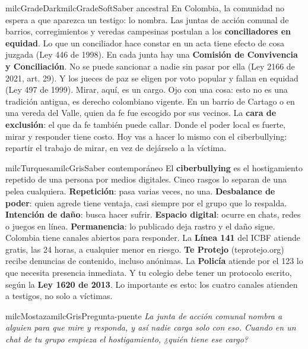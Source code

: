 \documentclass[11pt,letterpaper]{article}
\begin{document}
\begin{softbox}{milcGradeDark}{milcGradeSoft}{Saber ancestral}
En Colombia, la comunidad no espera a que aparezca un testigo: lo nombra. Las juntas de acción comunal de barrios, corregimientos y veredas campesinas postulan a los \textbf{conciliadores en equidad}. Lo que un conciliador hace constar en un acta tiene efecto de cosa juzgada (Ley 446 de 1998). En cada junta hay una \textbf{Comisión de Convivencia y Conciliación}. No se puede sancionar a nadie sin pasar por ella (Ley 2166 de 2021, art. 29). Y los jueces de paz se eligen por voto popular y fallan en equidad (Ley 497 de 1999). Mirar, aquí, es un cargo. Ojo con una cosa: esto no es una tradición antigua, es derecho colombiano vigente. En un barrio de Cartago o en una vereda del Valle, quien da fe fue escogido por sus vecinos. La \textbf{cara de exclusión}: el que da fe también puede callar. Donde el poder local es fuerte, mirar y responder tiene costo. Hoy vas a hacer lo mismo con el ciberbullying: repartir el trabajo de mirar, en vez de dejárselo a la víctima.\par{}
\end{softbox}

\begin{softbox}{milcTurquesa}{milcGris}{Saber contemporáneo}
El \textbf{ciberbullying} es el hostigamiento repetido de una persona por medios digitales. Cinco rasgos lo separan de una pelea cualquiera. \textbf{Repetición}: pasa varias veces, no una. \textbf{Desbalance de poder}: quien agrede tiene ventaja, casi siempre por el grupo que lo respalda. \textbf{Intención de daño}: busca hacer sufrir. \textbf{Espacio digital}: ocurre en chats, redes o juegos en línea. \textbf{Permanencia}: lo publicado deja rastro y el daño sigue. Colombia tiene canales abiertos para responder. La \textbf{Línea 141} del ICBF atiende gratis, las 24 horas, a cualquier menor en riesgo. \textbf{Te Protejo} (teprotejo.org) recibe denuncias de contenido, incluso anónimas. La \textbf{Policía} atiende por el 123 lo que necesita presencia inmediata. Y tu colegio debe tener un protocolo escrito, según la \textbf{Ley 1620 de 2013}. Lo importante es esto: los cuatro canales atienden a testigos, no solo a víctimas.
\end{softbox}

\begin{softbox}{milcMostaza}{milcGris}{Pregunta-puente}
\textit{La junta de acción comunal nombra a alguien para que mire y responda, y así nadie carga solo con eso. Cuando en un chat de tu grupo empieza el hostigamiento, ¿quién tiene ese cargo?}
\end{softbox}
\end{document}
